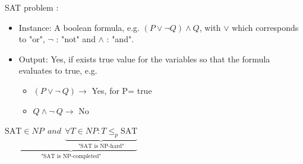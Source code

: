 \begin{definition} SAT problem :
\begin{itemize}
\item Instance: A boolean formula, e.g. $ \left( P \vee \neg Q \right) \wedge Q$, with $\vee$ which corresponds to "or", $\neg$ : "not" and $\wedge$ : "and".
\item Output: Yes, if exists true value for the variables so that the formula evaluates to true, e.g.  \begin{itemize}
\item $\left( P \vee \neg \ Q \right) \rightarrow$ Yes, for P= true
\item $Q \wedge \neg \ Q \rightarrow$ No
\end{itemize}  
\end{itemize}
\end{definition}
\vspace{0.5cm}
\begin{theorem}
$\underbrace{\text{SAT} \in NP \ \ and \ \ \underbrace{\forall T \in NP: T \leq_p \text{SAT}}_{\text{"SAT is NP-hard"}}}_{\text{"SAT is NP-completed"}}$
\end{theorem}

